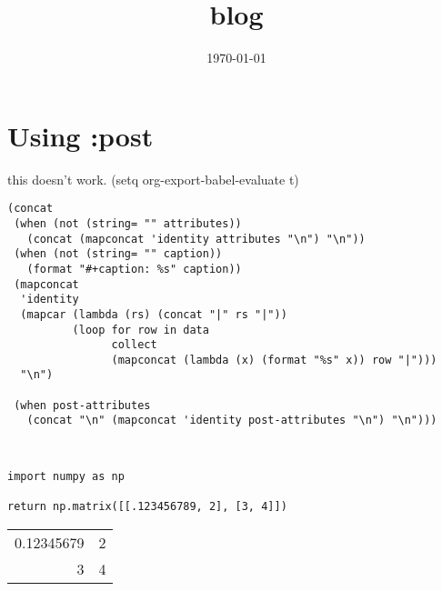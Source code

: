 \documentclass[11pt]{article}
\date{\today}
\title{blog}
\begin{document}
\section{Using :post}
\label{sec-1}
this doesn't work.
(setq org-export-babel-evaluate t)

\begin{verbatim}
(concat
 (when (not (string= "" attributes))
   (concat (mapconcat 'identity attributes "\n") "\n"))
 (when (not (string= "" caption))
   (format "#+caption: %s" caption))
 (mapconcat
  'identity
  (mapcar (lambda (rs) (concat "|" rs "|"))
          (loop for row in data
                collect
                (mapconcat (lambda (x) (format "%s" x)) row "|")))
  "\n")

 (when post-attributes
   (concat "\n" (mapconcat 'identity post-attributes "\n") "\n")))
\end{verbatim}

\begin{verbatim}


\end{verbatim}


\begin{verbatim}
import numpy as np

return np.matrix([[.123456789, 2], [3, 4]])
\end{verbatim}

\begin{center}
\begin{tabular}{rr}
0.12345679 & 2\\
3 & 4\\
\end{tabular}
\end{center}
\end{document}

